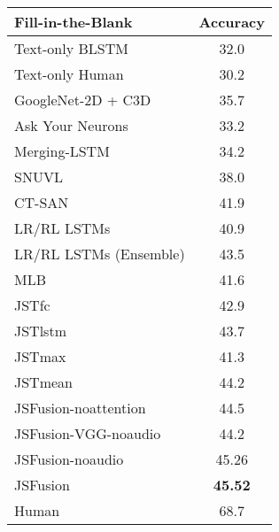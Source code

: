 \documentclass[runningheads]{llncs}
\begin{document}
\begin{table*}[tb]
\begin{tabular}{|l|cc|}
\hline
\end{tabular}
\hfill
\begin{tabular}{|l|c|}
\hline
Fill-in-the-Blank  & {\footnotesize Accuracy}   \\ \hline
Text-only BLSTM \cite{Tegan-arxiv-2016} & 32.0   \\
Text-only Human \cite{Tegan-arxiv-2016} & 30.2  \\
GoogleNet-2D + C3D \cite{Tegan-arxiv-2016}  & 35.7                     \\
Ask Your Neurons \cite{tzeng-iccv-2015}   & 33.2 \\
Merging-LSTM \cite{mazaheri-arxiv-2016}   & 34.2                     \\
SNUVL               \cite{yu-arxiv-2016}  & 38.0                     \\ 
CT-SAN            \cite{yu-cvpr-2017}     & 41.9                     \\
LR/RL LSTMs            \cite{mazaheri-iccv-2017} & 40.9       \\ 
LR/RL LSTMs (Ensemble) \cite{mazaheri-iccv-2017} & 43.5       \\ 
MLB \cite{Kim-iclr-2017} & 41.6                           \\   \hline
JSTfc						             & 42.9       \\  
JSTlstm						             & 43.7       \\  
JSTmax                   & 41.3                               \\ 
JSTmean                  & 44.2                                 \\ \hline
JSFusion-noattention      & 44.5                                 \\ 
JSFusion-VGG-noaudio     & 44.2                     \\
JSFusion-noaudio         & 45.26                    \\
JSFusion                 & \textbf{45.52}                    \\
\hline
Human  \cite{Tegan-arxiv-2016}              & 68.7              \\
\hline
\end{tabular}
\medskip
\caption{
    \textbf{Left}:
Performance comparison for the multiple-choice test using the accuracy in percentage.
We report the results on the two datasets of LSMDC (L) and MSR-VTT (M). \textbf{Right}:
    Accuracy comparison (in percentage) for the movie fill-in-the-blank task.
}
\vspace{-5pt}
\label{tbl:results_mcfib}
\end{table*}
\end{document}
